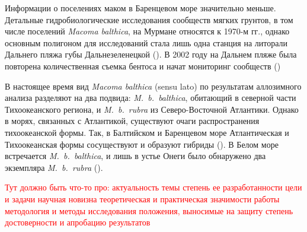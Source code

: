 Информации о поселениях маком в Баренцевом море значительно меньше. 
Детальные гидробиологические исследования сообществ мягких грунтов, в том числе  поселений {\it Macoma balthica}, на Мурмане относятся к 1970-м гг., однако основным полигоном для исследований стала лишь одна станция на литорали Дальнего пляжа губы Дальнезеленецкой (\cite{Agarova_et_al_1976}).
В 2002 году на Дальнем пляже была повторена количественная съемка бентоса и начат мониторинг сообществ (\cite{Genelt_Dalnezeleneckaya_2008})

В настоящее время вид {\it Macoma balthica} (sensu lato) по результатам аллозимного анализа  разделяют на два подвида: {\it M.~b.~balthica}, обитающий в северной части Тихоокеанского региона, и {\it M.~b.~rubra} из Северо-Восточной Атлантики. 
Однако  в морях, связанных с  Атлантикой, существуют очаги распространения тихоокеанской формы. 
Так, в Балтийском и Баренцевом море Атлантическая и Тихоокеанская формы сосуществуют и образуют гибриды (\cite{Vainola_2003}). 
В Белом море встречается {\it M.~b.~balthica}, и лишь в устье Онеги было обнаружено два экземпляра {\it M.~b.~rubra} (\cite{Nikula_et_al_2007}).




\textcolor{red}{Тут должно быть что-то про:
актуальность темы
степень ее разработанности
цели и задачи
научная новизна
теоретическая и практическая значимости работы
методология и методы исследования
положения, выносимые на защиту
степень достоверности и апробацию результатов}
